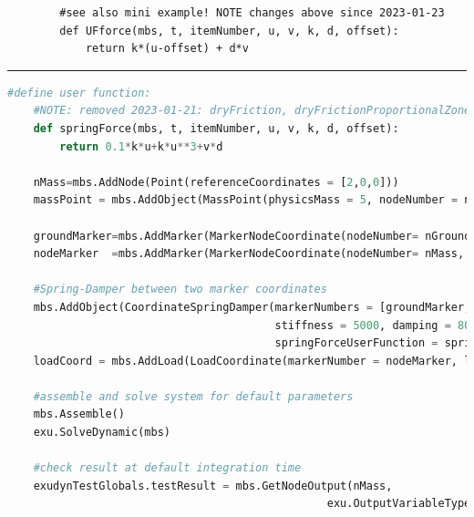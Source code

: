     \finishTable
    \userFunctionExample{}
    \pythonstyle\begin{lstlisting}
        #see also mini example! NOTE changes above since 2023-01-23
        def UFforce(mbs, t, itemNumber, u, v, k, d, offset):
            return k*(u-offset) + d*v
    \end{lstlisting}
\vspace{6pt}\par\noindent\rule{\textwidth}{0.4pt}
\label{miniExample_ObjectConnectorCoordinateSpringDamper}
\pythonstyle
\begin{lstlisting}[language=Python, firstnumber=1]
    #define user function:
    #NOTE: removed 2023-01-21: dryFriction, dryFrictionProportionalZone
    def springForce(mbs, t, itemNumber, u, v, k, d, offset): 
        return 0.1*k*u+k*u**3+v*d

    nMass=mbs.AddNode(Point(referenceCoordinates = [2,0,0]))
    massPoint = mbs.AddObject(MassPoint(physicsMass = 5, nodeNumber = nMass))
    
    groundMarker=mbs.AddMarker(MarkerNodeCoordinate(nodeNumber= nGround, coordinate = 0))
    nodeMarker  =mbs.AddMarker(MarkerNodeCoordinate(nodeNumber= nMass, coordinate = 0))
    
    #Spring-Damper between two marker coordinates
    mbs.AddObject(CoordinateSpringDamper(markerNumbers = [groundMarker, nodeMarker], 
                                         stiffness = 5000, damping = 80, 
                                         springForceUserFunction = springForce)) 
    loadCoord = mbs.AddLoad(LoadCoordinate(markerNumber = nodeMarker, load = 1)) #static linear solution:0.002

    #assemble and solve system for default parameters
    mbs.Assemble()
    exu.SolveDynamic(mbs)

    #check result at default integration time
    exudynTestGlobals.testResult = mbs.GetNodeOutput(nMass, 
                                                 exu.OutputVariableType.Displacement)[0]
\end{lstlisting}

